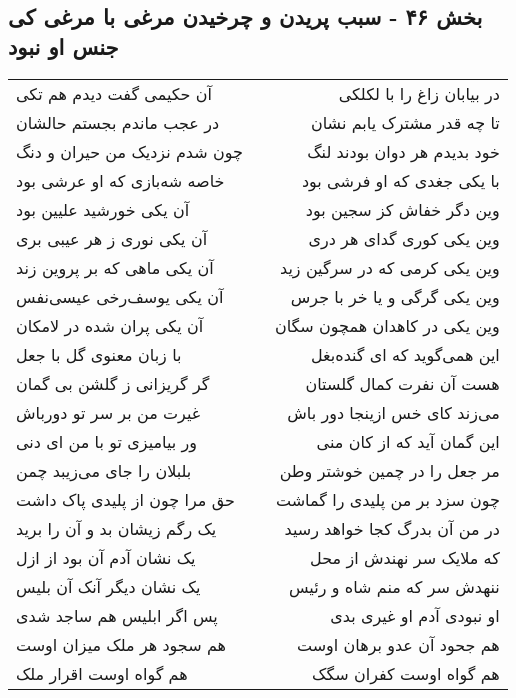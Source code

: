 \begin{center}
\section*{بخش ۴۶ - سبب پریدن و چرخیدن مرغی با مرغی کی جنس او نبود}
\label{sec:sh046}
\begin{longtable}{l p{0.5cm} r}
آن حکیمی گفت دیدم هم تکی
&&
در بیابان زاغ را با لکلکی
\\
در عجب ماندم بجستم حالشان
&&
تا چه قدر مشترک یابم نشان
\\
چون شدم نزدیک من حیران و دنگ
&&
خود بدیدم هر دوان بودند لنگ
\\
خاصه شه‌بازی که او عرشی بود
&&
با یکی جغدی که او فرشی بود
\\
آن یکی خورشید علیین بود
&&
وین دگر خفاش کز سجین بود
\\
آن یکی نوری ز هر عیبی بری
&&
وین یکی کوری گدای هر دری
\\
آن یکی ماهی که بر پروین زند
&&
وین یکی کرمی که در سرگین زید
\\
آن یکی یوسف‌رخی عیسی‌نفس
&&
وین یکی گرگی و یا خر با جرس
\\
آن یکی پران شده در لامکان
&&
وین یکی در کاهدان همچون سگان
\\
با زبان معنوی گل با جعل
&&
این همی‌گوید که ای گنده‌بغل
\\
گر گریزانی ز گلشن بی گمان
&&
هست آن نفرت کمال گلستان
\\
غیرت من بر سر تو دورباش
&&
می‌زند کای خس ازینجا دور باش
\\
ور بیامیزی تو با من ای دنی
&&
این گمان آید که از کان منی
\\
بلبلان را جای می‌زیبد چمن
&&
مر جعل را در چمین خوشتر وطن
\\
حق مرا چون از پلیدی پاک داشت
&&
چون سزد بر من پلیدی را گماشت
\\
یک رگم زیشان بد و آن را برید
&&
در من آن بدرگ کجا خواهد رسید
\\
یک نشان آدم آن بود از ازل
&&
که ملایک سر نهندش از محل
\\
یک نشان دیگر آنک آن بلیس
&&
ننهدش سر که منم شاه و رئیس
\\
پس اگر ابلیس هم ساجد شدی
&&
او نبودی آدم او غیری بدی
\\
هم سجود هر ملک میزان اوست
&&
هم جحود آن عدو برهان اوست
\\
هم گواه اوست اقرار ملک
&&
هم گواه اوست کفران سگک
\\
\end{longtable}
\end{center}
